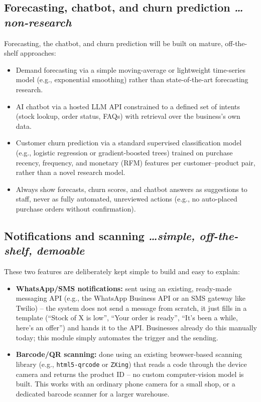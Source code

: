 \documentclass[11pt,a4paper]{article}
\newcommand{\BvrHint}[1]{%
  {\normalfont\normalsize\itshape\hfill #1}}
\begin{document}
\subsection{Forecasting, chatbot, and churn prediction %
\BvrHint{\ldots non-research}}
Forecasting, the chatbot, and churn prediction will be built on mature, off-the-shelf approaches:
\begin{itemize}[leftmargin=0.7cm]
    \item Demand forecasting via a simple moving-average or lightweight time-series model (e.g., exponential smoothing) rather than state-of-the-art forecasting research.
    \item AI chatbot via a hosted LLM API constrained to a defined set of intents (stock lookup, order status, FAQs) with retrieval over the business's own data.
    \item Customer churn prediction via a standard supervised classification model (e.g., logistic regression or gradient-boosted trees) trained on purchase recency, frequency, and monetary (RFM) features per customer--product pair, rather than a novel research model.
    \item Always show forecasts, churn scores, and chatbot answers as suggestions to staff, never as fully automated, unreviewed actions (e.g., no auto-placed purchase orders without confirmation).
\end{itemize}

\subsection{Notifications and scanning %
\BvrHint{\ldots simple, off-the-shelf, demoable}}
These two features are deliberately kept simple to build and easy to explain:
\begin{itemize}[leftmargin=0.7cm]
    \item \textbf{WhatsApp/SMS notifications:} sent using an existing, ready-made messaging API (e.g., the WhatsApp Business API or an SMS gateway like Twilio) -- the system does not send a message from scratch, it just fills in a template (``Stock of X is low'', ``Your order is ready'', ``It's been a while, here's an offer'') and hands it to the API. Businesses already do this manually today; this module simply automates the trigger and the sending.
    \item \textbf{Barcode/QR scanning:} done using an existing browser-based scanning library (e.g., \texttt{html5-qrcode} or \texttt{ZXing}) that reads a code through the device camera and returns the product ID -- no custom computer-vision model is built. This works with an ordinary phone camera for a small shop, or a dedicated barcode scanner for a larger warehouse.
\end{itemize}
\end{document}
